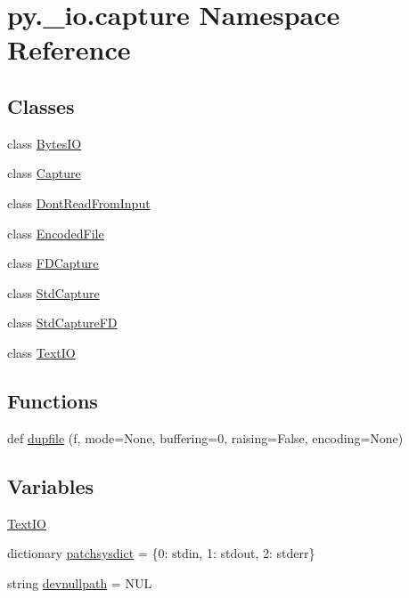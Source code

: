 \hypertarget{namespacepy_1_1__io_1_1capture}{}\section{py.\+\_\+io.\+capture Namespace Reference}
\label{namespacepy_1_1__io_1_1capture}
\subsection*{Classes}
\begin{DoxyCompactItemize}
\item 
class \hyperlink{classpy_1_1__io_1_1capture_1_1_bytes_i_o}{Bytes\+IO}
\item 
class \hyperlink{classpy_1_1__io_1_1capture_1_1_capture}{Capture}
\item 
class \hyperlink{classpy_1_1__io_1_1capture_1_1_dont_read_from_input}{Dont\+Read\+From\+Input}
\item 
class \hyperlink{classpy_1_1__io_1_1capture_1_1_encoded_file}{Encoded\+File}
\item 
class \hyperlink{classpy_1_1__io_1_1capture_1_1_f_d_capture}{F\+D\+Capture}
\item 
class \hyperlink{classpy_1_1__io_1_1capture_1_1_std_capture}{Std\+Capture}
\item 
class \hyperlink{classpy_1_1__io_1_1capture_1_1_std_capture_f_d}{Std\+Capture\+FD}
\item 
class \hyperlink{classpy_1_1__io_1_1capture_1_1_text_i_o}{Text\+IO}
\end{DoxyCompactItemize}
\subsection*{Functions}
\begin{DoxyCompactItemize}
\item 
def \hyperlink{namespacepy_1_1__io_1_1capture_ac1d822a17260bf0f089f12b2cc995415}{dupfile} (f, mode=None, buffering=0, raising=False, encoding=None)
\end{DoxyCompactItemize}
\subsection*{Variables}
\begin{DoxyCompactItemize}
\item 
\hyperlink{namespacepy_1_1__io_1_1capture_a5555f645d814f2cce030eb8266063226}{Text\+IO}
\item 
dictionary \hyperlink{namespacepy_1_1__io_1_1capture_ae2e6b0d2d8db857df88f25f6c5982e60}{patchsysdict} = \{0\+: \textquotesingle{}stdin\textquotesingle{}, 1\+: \textquotesingle{}stdout\textquotesingle{}, 2\+: \textquotesingle{}stderr\textquotesingle{}\}
\item 
string \hyperlink{namespacepy_1_1__io_1_1capture_a2470908410c83bd8715713d3b220b3af}{devnullpath} = \textquotesingle{}N\+UL\textquotesingle{}
\end{DoxyCompactItemize}


